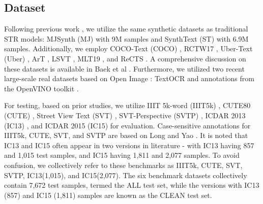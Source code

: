 \documentclass[runningheads]{llncs}
\begin{document}
\subsection{Dataset}
Following previous work \cite{baek2021if_TRBA_discuss,bautista2022parseq}, we utilize the same synthetic datasets as traditional STR models: MJSynth (MJ) \cite{jaderberg2014synthetic_MJ} with 9M samples and SynthText (ST) \cite{gupta2016synthetic_ST} with 6.9M samples.	Additionally, we employ COCO-Text (COCO) \cite{veit2016coco_Coco}, RCTW17 \cite{shi2017icdar2017_RCTW17}, Uber-Text (Uber) \cite{zhang2017uber_Uber}, ArT \cite{chng2019icdar2019_art}, LSVT \cite{sun2019icdar_LSVT}, MLT19 \cite{nayef2019icdar2019_MLT19}, and ReCTS \cite{zhang2019icdar_ReCTS}.	A comprehensive discussion on these datasets is available in Baek et al \cite{baek2021if_TRBA_discuss}.	Furthermore, we utilized two recent large-scale real datasets based on Open Image \cite{krasin2017openimages_openimages}: TextOCR \cite{singh2021textocr_TextOCR} and annotations from the OpenVINO toolkit \cite{krylov2021open_openvino}.

For testing, based on prior studies, we utilize IIIT 5k-word (IIIT5k) \cite{mishra2012scene_iii5k}, CUTE80 (CUTE) \cite{risnumawan2014robust_cute80}, Street View Text (SVT) \cite{wang2011end_SVt}, SVT-Perspective (SVTP) \cite{phan2013recognizing_svtp}, ICDAR 2013 (IC13) \cite{karatzas2013icdar_IC13}, and ICDAR 2015 (IC15) \cite{karatzas2015icdar_IC15} for evaluation.	Case-sensitive annotations for IIIT5k, CUTE, SVT, and SVTP are based on Long and Yao \cite{long2020unrealtext_sensitive4test}.	It is noted that IC13 and IC15 often appear in two versions in literature - with IC13 having 857 and 1,015 test samples, and IC15 having 1,811 and 2,077 samples.	To avoid confusion, we collectively refer to these benchmarks as IIIT5k, CUTE, SVT, SVTP, IC13(1,015), and IC15(2,077).	The six benchmark datasets collectively contain 7,672 test samples, termed the ALL test set, while the versions with IC13 (857) and IC15 (1,811) samples are known as the CLEAN test set.	
\end{document}

